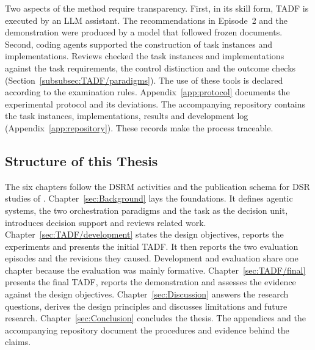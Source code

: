 Two aspects of the method require transparency. First, in its skill form, TADF is executed by an LLM assistant. The recommendations in Episode~2 and the demonstration were produced by a model that followed frozen documents. Second, coding agents supported the construction of task instances and implementations. Reviews checked the task instances and implementations against the task requirements, the control distinction and the outcome checks (Section~\ref{subsubsec:TADF/paradigms}). The use of these tools is declared according to the examination rules. Appendix~\ref{app:protocol} documents the experimental protocol and its deviations. The accompanying repository contains the task instances, implementations, results and development log (Appendix~\ref{app:repository}). These records make the process traceable.

\subsection{Structure of this Thesis}
\label{subsec:intro/structure}
The six chapters follow the DSRM activities and the publication schema for DSR studies of \textcite{gregorPositioningPresentingDesign2013}. Chapter~\ref{sec:Background} lays the foundations. It defines agentic systems, the two orchestration paradigms and the task as the decision unit, introduces decision support and reviews related work. Chapter~\ref{sec:TADF/development} states the design objectives, reports the experiments and presents the initial TADF. It then reports the two evaluation episodes and the revisions they caused. Development and evaluation share one chapter because the evaluation was mainly formative. Chapter~\ref{sec:TADF/final} presents the final TADF, reports the demonstration and assesses the evidence against the design objectives. Chapter~\ref{sec:Discussion} answers the research questions, derives the design principles and discusses limitations and future research. Chapter~\ref{sec:Conclusion} concludes the thesis. The appendices and the accompanying repository document the procedures and evidence behind the claims.
